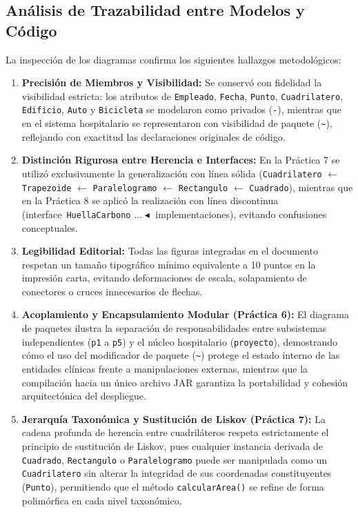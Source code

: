 \documentclass[letterpaper,12pt,oneside]{article}
\numberwithin{figure}{section}
\begin{document}
\subsection{An\'alisis de Trazabilidad entre Modelos y C\'odigo}
La inspecci\'on de los diagramas confirma los siguientes hallazgos metodol\'ogicos:
\begin{enumerate}
    \item \textbf{Precisi\'on de Miembros y Visibilidad:} Se conserv\'o con fidelidad la visibilidad estricta: los atributos de \texttt{Empleado}, \texttt{Fecha}, \texttt{Punto}, \texttt{Cuadrilatero}, \texttt{Edificio}, \texttt{Auto} y \texttt{Bicicleta} se modelaron como privados (\texttt{-}), mientras que en el sistema hospitalario se representaron con visibilidad de paquete (\texttt{\~{}}), reflejando con exactitud las declaraciones originales de c\'odigo.
    \item \textbf{Distinci\'on Rigurosa entre Herencia e Interfaces:} En la Pr\'actica 7 se utiliz\'o exclusivamente la generalizaci\'on con l\'inea s\'olida (\texttt{Cuadrilatero} $\leftarrow$ \texttt{Trapezoide} $\leftarrow$ \texttt{Paralelogramo} $\leftarrow$ \texttt{Rectangulo} $\leftarrow$ \texttt{Cuadrado}), mientras que en la Pr\'actica 8 se aplic\'o la realizaci\'on con l\'inea discontinua (\guillemotleft interface\guillemotright\ \texttt{HuellaCarbono} $\dots\blacktriangleleft$ implementaciones), evitando confusiones conceptuales.
    \item \textbf{Legibilidad Editorial:} Todas las figuras integradas en el documento respetan un tama\~no tipogr\'afico m\'inimo equivalente a 10 puntos en la impresi\'on carta, evitando deformaciones de escala, solapamiento de conectores o cruces innecesarios de flechas.
    \item \textbf{Acoplamiento y Encapsulamiento Modular (Pr\'actica 6):} El diagrama de paquetes ilustra la separaci\'on de responsabilidades entre subsistemas independientes (\texttt{p1} a \texttt{p5}) y el n\'ucleo hospitalario (\texttt{proyecto}), demostrando c\'omo el uso del modificador de paquete (\texttt{\~{}}) protege el estado interno de las entidades cl\'inicas frente a manipulaciones externas, mientras que la compilaci\'on hacia un \'unico archivo JAR garantiza la portabilidad y cohesi\'on arquitect\'onica del despliegue.
    \item \textbf{Jerarqu\'ia Taxon\'omica y Sustituci\'on de Liskov (Pr\'actica 7):} La cadena profunda de herencia entre cuadril\'ateros respeta estrictamente el principio de sustituci\'on de Liskov, pues cualquier instancia derivada de \texttt{Cuadrado}, \texttt{Rectangulo} o \texttt{Paralelogramo} puede ser manipulada como un \texttt{Cuadrilatero} sin alterar la integridad de sus coordenadas constituyentes (\texttt{Punto}), permitiendo que el m\'etodo \texttt{calcularArea()} se refine de forma polim\'orfica en cada nivel taxon\'omico.

\end{enumerate}
\end{document}
